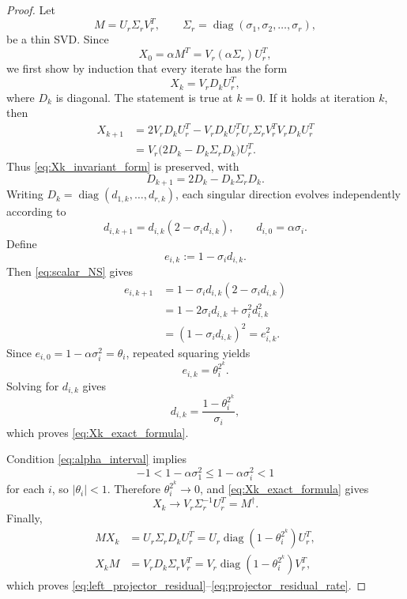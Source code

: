 \documentclass[10pt,a4paper]{amsart}
\begin{document}
\begin{proof}
Let
\[
    M=U_r\Sigma_rV_r^T, \qquad \Sigma_r=\operatorname{diag}(\sigma_1,\sigma_2,\ldots,\sigma_r),
\]
be a thin SVD. Since
\[
    X_0=\alpha M^T =V_r(\alpha\Sigma_r)U_r^T,
\]
we first show by induction that every iterate has the form
\begin{equation} \label{eq:Xk_invariant_form}
    X_k=V_rD_kU_r^T,
\end{equation}
where \(D_k\) is diagonal. The statement is true at \(k=0\). If it holds at iteration \(k\), then
\begin{align*}
    X_{k+1}
    & =2V_rD_kU_r^T -V_rD_kU_r^T U_r\Sigma_rV_r^T V_rD_kU_r^T
    \\& =V_r\bigl(2D_k-D_k\Sigma_rD_k\bigr)U_r^T.
\end{align*}
Thus \eqref{eq:Xk_invariant_form} is preserved, with
\[
    D_{k+1}=2D_k-D_k\Sigma_rD_k.
\]
Writing \(D_k=\operatorname{diag}(d_{1,k},\ldots,d_{r,k})\), each singular direction evolves independently according to
\begin{equation} \label{eq:scalar_NS}
    d_{i,k+1}=d_{i,k}(2-\sigma_i d_{i,k}), \qquad d_{i,0}=\alpha\sigma_i.
\end{equation}
Define
\[
    e_{i,k}:=1-\sigma_i d_{i,k}.
\]
Then \eqref{eq:scalar_NS} gives
\begin{align*}
    e_{i,k+1}
    &=1-\sigma_i d_{i,k}(2-\sigma_i d_{i,k})\\
    &=1-2\sigma_i d_{i,k}+\sigma_i^2d_{i,k}^2\\
    &=(1-\sigma_i d_{i,k})^2 =e_{i,k}^2.
\end{align*}
Since \(e_{i,0}=1-\alpha\sigma_i^2=\theta_i\), repeated squaring yields
\[
    e_{i,k}=\theta_i^{2^k}.
\]
Solving for \(d_{i,k}\) gives
\[
    d_{i,k}=\frac{1-\theta_i^{2^k}}{\sigma_i},
\]
which proves \eqref{eq:Xk_exact_formula}.

Condition \eqref{eq:alpha_interval} implies
\[
    -1<1-\alpha\sigma_1^2 \leq 1-\alpha\sigma_i^2<1
\]
for each \(i\), so \(|\theta_i|<1\). Therefore \(\theta_i^{2^k}\to0\), and \eqref{eq:Xk_exact_formula} gives
\[
    X_k\longrightarrow V_r\Sigma_r^{-1}U_r^T =M^\dagger.
\]
Finally,
\begin{align*}
    MX_k &=U_r\Sigma_rD_kU_r^T =U_r\operatorname{diag}(1-\theta_i^{2^k})U_r^T,
    \\ X_kM &=V_rD_k\Sigma_rV_r^T =V_r\operatorname{diag}(1-\theta_i^{2^k})V_r^T,
\end{align*}
which proves \eqref{eq:left_projector_residual}--\eqref{eq:projector_residual_rate}.
\end{proof}
\end{document}
